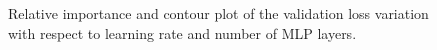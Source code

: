 \begin{figure}[ht!]
    \centering
        \hfill
    \caption{Relative importance and contour plot of the validation loss variation with respect to learning rate and  number of MLP layers.}\label{fig:HP_visualizations}
\end{figure}










